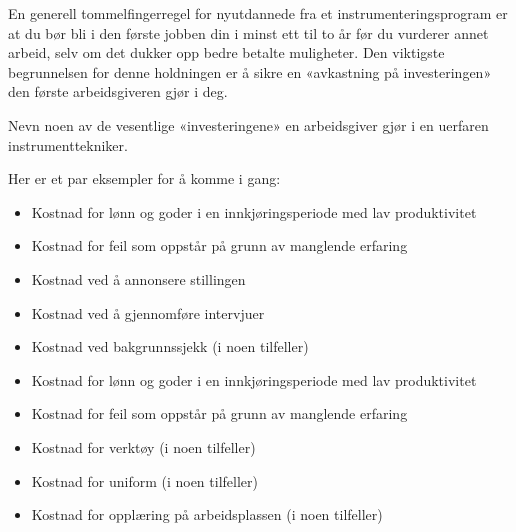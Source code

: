 

En generell tommelfingerregel for nyutdannede fra et instrumenteringsprogram er at du bør bli i den første jobben din i minst ett til to år før du vurderer annet arbeid, selv om det dukker opp bedre betalte muligheter. Den viktigste begrunnelsen for denne holdningen er å sikre en «avkastning på investeringen» den første arbeidsgiveren gjør i deg.

\vskip 10pt

Nevn noen av de vesentlige «investeringene» en arbeidsgiver gjør i en uerfaren instrumenttekniker.

\vskip 50pt







Her er et par eksempler for å komme i gang:

\begin{itemize}
\item{} Kostnad for lønn og goder i en innkjøringsperiode med lav produktivitet
\item{} Kostnad for feil som oppstår på grunn av manglende erfaring
\end{itemize}







\begin{itemize}
\item{} Kostnad ved å annonsere stillingen
\item{} Kostnad ved å gjennomføre intervjuer
\item{} Kostnad ved bakgrunnssjekk (i noen tilfeller)
\item{} Kostnad for lønn og goder i en innkjøringsperiode med lav produktivitet
\item{} Kostnad for feil som oppstår på grunn av manglende erfaring
\item{} Kostnad for verktøy (i noen tilfeller)
\item{} Kostnad for uniform (i noen tilfeller)
\item{} Kostnad for opplæring på arbeidsplassen (i noen tilfeller)
\end{itemize}

